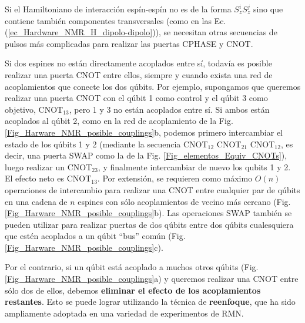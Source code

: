 \documentclass[a4paper,11pt]{book} %
\numberwithin{equation}{chapter}
\begin{document}
Si el Hamiltoniano de interacción espín-espín no es de la forma $S_z^i S_z^j$ sino que contiene también componentes transversales (como en las Ec. (\ref{ec_Hardware_NMR_H_dipolo-dipolo})), se necesitan otras secuencias de pulsos más complicadas para realizar las puertas CPHASE y CNOT.

Si dos espines no están directamente acoplados entre sí, todavía es posible realizar una puerta CNOT entre ellos, siempre y cuando exista una red de acoplamientos que conecte los dos qúbits. Por ejemplo, supongamos que queremos realizar una puerta CNOT con el qúbit 1 como control y el qúbit 3 como objetivo, CNOT$_{13}$, pero 1 y 3 no están acoplados entre sí. Si ambos están acoplados al qúbit 2, como en la red de acoplamiento de la Fig. \ref{Fig_Harware_NMR_posible_couplings}b, podemos primero intercambiar el estado de los qúbits 1 y 2 (mediante la secuencia CNOT$_{12}$ CNOT$_{21}$ CNOT$_{12}$, es decir, una puerta SWAP como la de la Fig. \ref{Fig_elementos_Equiv_CNOTs}), luego realizar un CNOT$_{23}$, y finalmente intercambiar de nuevo los qubits 1 y 2. El efecto neto es CNOT$_{13}$. Por extensión, se requieren como máximo $O(n)$ operaciones de intercambio para realizar una CNOT entre cualquier par de qúbits en una cadena de $n$ espines con sólo acoplamientos de vecino más cercano (Fig. \ref{Fig_Harware_NMR_posible_couplings}b). Las operaciones SWAP también se pueden utilizar para realizar puertas de dos qúbits entre dos qúbits cualesquiera que estén acoplados a un qúbit ``bus'' común (Fig. \ref{Fig_Harware_NMR_posible_couplings}c).

Por el contrario, si un qúbit está acoplado a muchos otros qúbits (Fig. \ref{Fig_Harware_NMR_posible_couplings}a) y queremos realizar una CNOT entre sólo dos de ellos, debemos \textbf{eliminar el efecto de los acoplamientos restantes}. Esto se puede lograr utilizando la técnica de \textbf{reenfoque}, que ha sido ampliamente adoptada en una variedad de experimentos de RMN.
\end{document}
